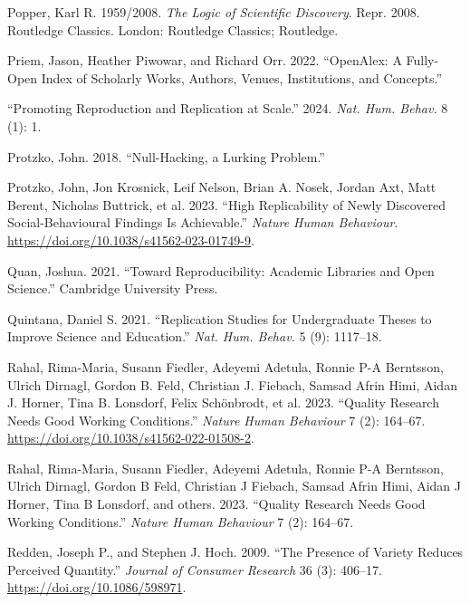 \documentclass[
  letterpaper,
  DIV=11,
  numbers=noendperiod]{scrreprt}
\newlength{\cslhangindent}
\newenvironment{CSLReferences}[2] %
 {\begin{list}{}{%
  \setlength{\itemindent}{0pt}
  \setlength{\leftmargin}{0pt}
  \setlength{\parsep}{0pt}
  \ifodd #1
   \setlength{\leftmargin}{\cslhangindent}
   \setlength{\itemindent}{-1\cslhangindent}
  \fi
  \setlength{\itemsep}{#2\baselineskip}}}
 {\end{list}}
\begin{document}
\begin{CSLReferences}{1}{0}
Popper, Karl R. 1959/2008. \emph{The Logic of Scientific Discovery}.
Repr. 2008. Routledge Classics. London: {Routledge Classics}; Routledge.

Priem, Jason, Heather Piwowar, and Richard Orr. 2022. {``{OpenAlex}: A
Fully-Open Index of Scholarly Works, Authors, Venues, Institutions, and
Concepts.''}

{``Promoting Reproduction and Replication at Scale.''} 2024. \emph{Nat.
Hum. Behav.} 8 (1): 1.

Protzko, John. 2018. {``Null-Hacking, a Lurking Problem.''}

Protzko, John, Jon Krosnick, Leif Nelson, Brian A. Nosek, Jordan Axt,
Matt Berent, Nicholas Buttrick, et al. 2023. {``High Replicability of
Newly Discovered Social-Behavioural Findings Is Achievable.''}
\emph{Nature Human Behaviour}.
\url{https://doi.org/10.1038/s41562-023-01749-9}.

Quan, Joshua. 2021. {``Toward Reproducibility: Academic Libraries and
Open Science.''} Cambridge University Press.

Quintana, Daniel S. 2021. {``Replication Studies for Undergraduate
Theses to Improve Science and Education.''} \emph{Nat. Hum. Behav.} 5
(9): 1117--18.

Rahal, Rima-Maria, Susann Fiedler, Adeyemi Adetula, Ronnie P-A
Berntsson, Ulrich Dirnagl, Gordon B. Feld, Christian J. Fiebach, Samsad
Afrin Himi, Aidan J. Horner, Tina B. Lonsdorf, Felix Schönbrodt, et al.
2023. {``Quality Research Needs Good Working Conditions.''} \emph{Nature
Human Behaviour} 7 (2): 164--67.
\url{https://doi.org/10.1038/s41562-022-01508-2}.

Rahal, Rima-Maria, Susann Fiedler, Adeyemi Adetula, Ronnie P-A
Berntsson, Ulrich Dirnagl, Gordon B Feld, Christian J Fiebach, Samsad
Afrin Himi, Aidan J Horner, Tina B Lonsdorf, and others. 2023.
{``Quality Research Needs Good Working Conditions.''} \emph{Nature Human
Behaviour} 7 (2): 164--67.

Redden, Joseph P., and Stephen J. Hoch. 2009. {``The Presence of Variety
Reduces Perceived Quantity.''} \emph{Journal of Consumer Research} 36
(3): 406--17. \url{https://doi.org/10.1086/598971}.


\end{CSLReferences}
\end{document}
